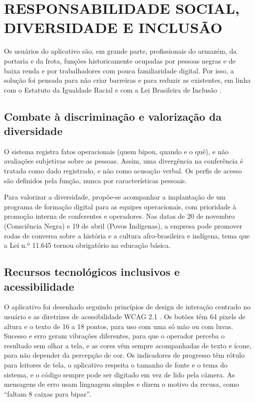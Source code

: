\chapter{RESPONSABILIDADE SOCIAL, DIVERSIDADE E INCLUSÃO}

Os usuários do aplicativo são, em grande parte, profissionais do armazém, da portaria e da frota, funções historicamente ocupadas por pessoas negras e de baixa renda e por trabalhadores com pouca familiaridade digital. Por isso, a solução foi pensada para não criar barreiras e para reduzir as existentes, em linha com o Estatuto da Igualdade Racial \cite{brasil2010igualdade} e com a Lei Brasileira de Inclusão \cite{brasil2015lbi}.

\section{Combate à discriminação e valorização da diversidade}

O sistema registra fatos operacionais (quem bipou, quando e o quê), e não avaliações subjetivas sobre as pessoas. Assim, uma divergência na conferência é tratada como dado registrado, e não como acusação verbal. Os perfis de acesso são definidos pela função, nunca por características pessoais.

Para valorizar a diversidade, propõe-se acompanhar a implantação de um programa de formação digital para as equipes operacionais, com prioridade à promoção interna de conferentes e operadores. Nas datas de 20 de novembro (Consciência Negra) e 19 de abril (Povos Indígenas), a empresa pode promover rodas de conversa sobre a história e a cultura afro-brasileira e indígena, tema que a Lei n.º 11.645 \cite{brasil2008} tornou obrigatório na educação básica.

\section{Recursos tecnológicos inclusivos e acessibilidade}

O aplicativo foi desenhado seguindo princípios de design de interação centrado no usuário \cite{preece2013} e as diretrizes de acessibilidade WCAG 2.1 \cite{w3c2018}. Os botões têm 64 pixels de altura e o texto de 16 a 18 pontos, para uso com uma só mão ou com luvas. Sucesso e erro geram vibrações diferentes, para que o operador perceba o resultado sem olhar a tela, e as cores vêm sempre acompanhadas de texto e ícone, para não depender da percepção de cor. Os indicadores de progresso têm rótulo para leitores de tela, o aplicativo respeita o tamanho de fonte e o tema do sistema, e o código sempre pode ser digitado em vez de lido pela câmera. As mensagens de erro usam linguagem simples e dizem o motivo da recusa, como ``faltam 8 caixas para bipar''.

